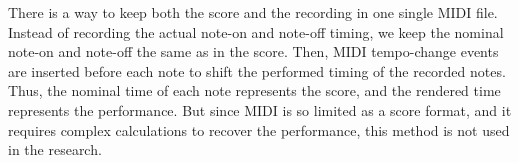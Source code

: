 There is a way to keep both the score and the recording in one single MIDI file. Instead of recording the actual note-on and note-off timing, we keep the nominal note-on and note-off the same as in the score. Then, MIDI tempo-change events are inserted before each note to shift the performed timing of the recorded notes. Thus, the nominal time of each note represents the score, and the rendered time represents the performance. But since MIDI is so limited as a score format, and it requires complex calculations to recover the performance, this method is not used in the research.


